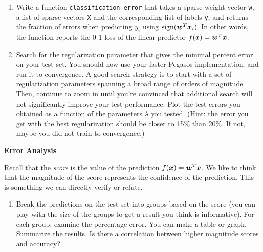 \documentclass{article}
\newcommand{\nyuparagrah}[1]{\textcolor{nyupurple}{\large #1}}
\newcommand{\code}[1]{\texttt{#1}}
\theoremstyle{plain}
\theoremstyle{definition}
\begin{document}
\begin{enumerate}
\item Write a function \code{classification\_error} that takes a sparse weight vector \code{w}, a list of sparse vectors \code{X} and the corresponding list of labels \code{y}, and returns the fraction of errors when predicting $y_i$
using $\textrm{sign}(\boldsymbol{w}^{T}\boldsymbol{x}_i)$. In other words, the function reports the 0-1
loss of the linear predictor $f(\boldsymbol{x}) = \boldsymbol{w}^{T}\boldsymbol{x}$.

\item Search for the regularization parameter that gives the minimal percent error
on your test set. You should now use your faster Pegasos implementation,
and run it to convergence. A good search strategy is to start with
a set of regularization parameters spanning a broad range of orders
of magnitude. Then, continue to zoom in until you're convinced that
additional search will not significantly improve your test performance.
Plot the test errors you obtained as a function of the parameters $\lambda$ you tested. (Hint: the error you get with the best regularization should be closer to 15\% than 20\%. If not, maybe you did not train to convergence.)\\

\setcounter{saveenum}{\value{enumi}}
\end{enumerate}

\nyuparagrah{\bf Error Analysis}

Recall that the \emph{score} is the value of the prediction
$f(\boldsymbol{x})=\boldsymbol{w}^{T} \boldsymbol{x}$. We like to think that the magnitude of the score represents
the confidence of the prediction. This is something we can directly
verify or refute.

\begin{enumerate}
  \setcounter{enumi}{\value{saveenum}}
\item  Break the predictions on the test set into groups based on the score
(you can play with the size of the groups to get a result you think
is informative). For each group, examine the percentage error. You
can make a table or graph. Summarize the results. Is there a correlation
between higher magnitude scores and accuracy?\\


\setcounter{saveenum}{\value{enumi}}
\end{enumerate}
\end{document}

